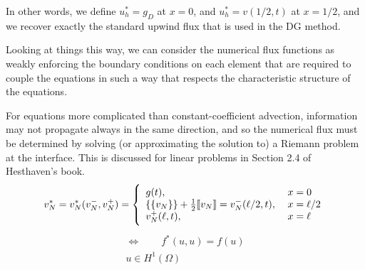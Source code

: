 In other words, we define $u_h^* = g_D$ at $x = 0$, and $u_h^* = v(1/2,t)$ at $x=1/2$, and we recover exactly the standard upwind flux that is used in the DG method.

Looking at things this way, we can consider the numerical flux functions as weakly enforcing the boundary conditions on each element that are required to couple the equations in such a way that respects the characteristic structure of the equations.

For equations more complicated than constant-coefficient advection, information may not propagate always in the same direction, and so the numerical flux must be determined by solving (or approximating the solution to) a Riemann problem at the interface. This is discussed for linear problems in Section 2.4 of Hesthaven's book.
\begin{align*}
  v_N^* = v_N^* (v_N^-, v_N^+) = \left\{  \begin{array}{l l} g(t), \; &x = 0 \\ \{\{ v_N \}\} + \frac{1}{2}\llbracket v_N \rrbracket = v_N^-(\ell/2, t) ,\; &x=\ell/2 \\ v_N^+(\ell,t),\; &x=\ell\end{array}  \right.
\end{align*}
\begin{align*}
  \Leftrightarrow \qquad f^*(u,u) = f(u)\\
  u \in H^1(\Omega)
\end{align*}

